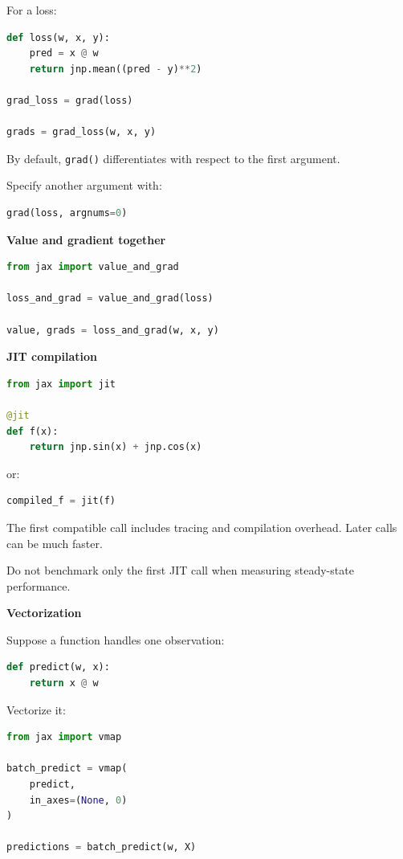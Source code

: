 \documentclass[11pt,letterpaper]{article}
\begin{document}
For a loss:

\begin{lstlisting}[language=Python]
def loss(w, x, y):
    pred = x @ w
    return jnp.mean((pred - y)**2)

grad_loss = grad(loss)

grads = grad_loss(w, x, y)
\end{lstlisting}

By default, \texttt{grad()} differentiates with respect to the first argument.

Specify another argument with:

\begin{lstlisting}[language=Python]
grad(loss, argnums=0)
\end{lstlisting}

\textbf{Value and gradient together}

\begin{lstlisting}[language=Python]
from jax import value_and_grad

loss_and_grad = value_and_grad(loss)

value, grads = loss_and_grad(w, x, y)
\end{lstlisting}

\textbf{JIT compilation}

\begin{lstlisting}[language=Python]
from jax import jit

@jit
def f(x):
    return jnp.sin(x) + jnp.cos(x)
\end{lstlisting}

or:

\begin{lstlisting}[language=Python]
compiled_f = jit(f)
\end{lstlisting}

The first compatible call includes tracing and compilation overhead. Later
calls can be much faster.

Do not benchmark only the first JIT call when measuring steady-state
performance.

\textbf{Vectorization}

Suppose a function handles one observation:

\begin{lstlisting}[language=Python]
def predict(w, x):
    return x @ w
\end{lstlisting}

Vectorize it:

\begin{lstlisting}[language=Python]
from jax import vmap

batch_predict = vmap(
    predict,
    in_axes=(None, 0)
)

predictions = batch_predict(w, X)
\end{lstlisting}
\end{document}
